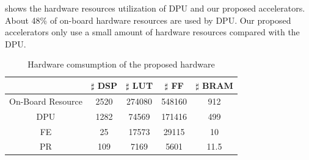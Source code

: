  shows the hardware resources utilization of DPU and our proposed accelerators. About 48\% of on-board hardware resources are used by DPU. Our proposed accelerators only use a small amount of hardware resources compared with the DPU.
\begin{table}[t]
  \centering
  \caption{Hardware comsumption of the proposed hardware}
\begin{tabular}{|c|c|c|c|c|}
  \hline
        & $\sharp$ DSP & $\sharp$ LUT & $\sharp$ FF & $\sharp$ BRAM \bigstrut\\
  \hline
  On-Board Resource &   2520   &  274080      &  548160     & 912 \bigstrut\\
  \hline
  DPU &   1282   &  74569      &   171416    & 499 \bigstrut\\
  \hline
  FE & 25      &  17573     &   29115    & 10 \bigstrut\\
  \hline
  PR & 109      &  7169     &   5601    & 11.5 \bigstrut\\
  \hline
  \end{tabular}%
  
  
  
  
  \label{tab:hardware}%
\end{table}%